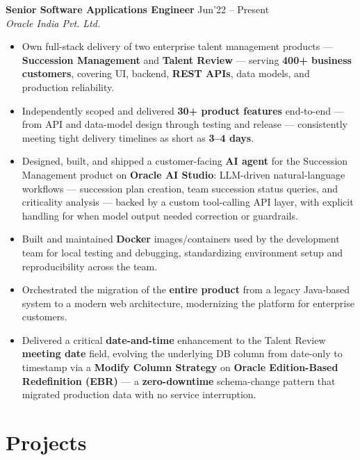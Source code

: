 \documentclass[10pt,a4paper]{article}
\newcommand{\resumeItem}[1]{\item[\textcolor{primary}{\textbullet}] #1}
\begin{document}
\textbf{Senior Software Applications Engineer} \hfill Jun'22 -- Present\\
\textit{Oracle India Pvt. Ltd.}
\begin{itemize}[leftmargin=1.05em, nosep, topsep=2pt, itemsep=2pt, parsep=0pt]
    \resumeItem{Own full-stack delivery of two enterprise talent management products --- \textbf{Succession Management} and \textbf{Talent Review} --- serving \textbf{400+ business customers}, covering UI, backend, \textbf{REST APIs}, data models, and production reliability.}
    \resumeItem{Independently scoped and delivered \textbf{30+ product features} end-to-end --- from API and data-model design through testing and release --- consistently meeting tight delivery timelines as short as \textbf{3--4 days}.}
    \resumeItem{Designed, built, and shipped a customer-facing \textbf{AI agent} for the Succession Management product on \textbf{Oracle AI Studio}: LLM-driven natural-language workflows --- succession plan creation, team succession status queries, and criticality analysis --- backed by a custom tool-calling API layer, with explicit handling for when model output needed correction or guardrails.}
    \resumeItem{Built and maintained \textbf{Docker} images/containers used by the development team for local testing and debugging, standardizing environment setup and reproducibility across the team.}
    \resumeItem{Orchestrated the migration of the \textbf{entire product} from a legacy Java-based system to a modern web architecture, modernizing the platform for enterprise customers.}
    \resumeItem{Delivered a critical \textbf{date-and-time} enhancement to the Talent Review \textbf{meeting date} field, evolving the underlying DB column from date-only to timestamp via a \textbf{Modify Column Strategy} on \textbf{Oracle Edition-Based Redefinition (EBR)} --- a \textbf{zero-downtime} schema-change pattern that migrated production data with no service interruption.}
\end{itemize}


\section{Projects}
\small
\end{document}
